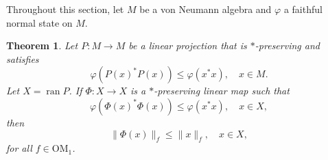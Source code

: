 \documentclass[a4paper,12pt]{amsart}
\newcommand{\norm}[1]{\lVert#1\rVert}
\newcommand{\OM}{\mathrm{OM}}
\renewcommand{\phi}{\varphi}
\theoremstyle{plain}
\newtheorem{theorem}[proposition]{Theorem}
\theoremstyle{remark}
\theoremstyle{definition}
\begin{document}
Throughout this section, let $M$ be a von Neumann algebra and $\phi$ a faithful normal state on $M$.

\begin{theorem}\label{thm:exact_interpolation}
    Let $P\colon M\to M$ be a linear projection that is $\ast$-preserving and satisfies 
    \begin{equation*}
        \phi(P(x)^\ast P(x))\leq \phi(x^\ast x),\quad x\in M.
    \end{equation*}
    Let $X=\operatorname{ran} P$. If $\Phi\colon X\to X$ is a $\ast$-preserving linear map such that 
    \begin{equation*}
        \phi(\Phi(x)^\ast \Phi(x))\leq \phi(x^\ast x),\quad x\in X,
    \end{equation*}
    then
    \begin{equation*}
        \norm{\Phi(x)}_f\leq \norm{x}_f,\quad x\in X,
    \end{equation*}
    for all $f\in\OM_1$.
\end{theorem}
\end{document}

